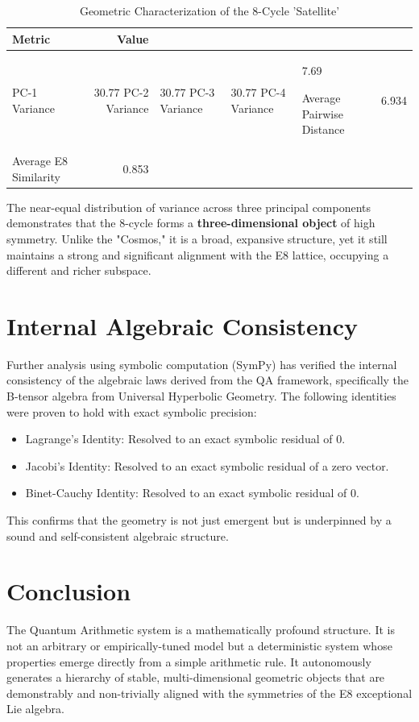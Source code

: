 \documentclass{article}
\begin{document}
\begin{table}[h!]
    \centering
    \caption{Geometric Characterization of the 8-Cycle 'Satellite'}
    \label{tab:geometric_characterization_of_the_8-cycle_'satellite'}
    \begin{tabular}{l r}
        \hline
        \textbf{Metric} & \textbf{Value} \\
        \hline
        PC-1 Variance & 30.77%
        PC-2 Variance & 30.77%
        PC-3 Variance & 30.77%
        PC-4 Variance & 7.69%

        Average Pairwise Distance & 6.934 \\
        Average E8 Similarity & 0.853 \\
        \hline
    \end{tabular}
\end{table}

The near-equal distribution of variance across three principal components demonstrates that the 8-cycle forms a \textbf{three-dimensional object} of high symmetry. Unlike the "Cosmos," it is a broad, expansive structure, yet it still maintains a strong and significant alignment with the E8 lattice, occupying a different and richer subspace.

\section{Internal Algebraic Consistency}
Further analysis using symbolic computation (SymPy) has verified the internal consistency of the algebraic laws derived from the QA framework, specifically the B-tensor algebra from Universal Hyperbolic Geometry. The following identities were proven to hold with exact symbolic precision:
\begin{itemize}
    \item Lagrange's Identity: Resolved to an exact symbolic residual of 0.
    \item Jacobi's Identity: Resolved to an exact symbolic residual of a zero vector.
    \item Binet-Cauchy Identity: Resolved to an exact symbolic residual of 0.
\end{itemize}
This confirms that the geometry is not just emergent but is underpinned by a sound and self-consistent algebraic structure.

\section{Conclusion}
The Quantum Arithmetic system is a mathematically profound structure. It is not an arbitrary or empirically-tuned model but a deterministic system whose properties emerge directly from a simple arithmetic rule. It autonomously generates a hierarchy of stable, multi-dimensional geometric objects that are demonstrably and non-trivially aligned with the symmetries of the E8 exceptional Lie algebra.
\end{document}
